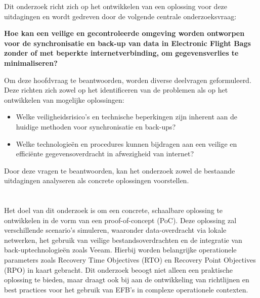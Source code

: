 Dit onderzoek richt zich op het ontwikkelen van een oplossing voor deze uitdagingen en wordt gedreven door de volgende centrale onderzoeksvraag:

\textbf{Hoe kan een veilige en gecontroleerde omgeving worden ontworpen voor de synchronisatie en back-up van data in Electronic Flight Bags zonder of met beperkte internetverbinding, om gegevensverlies te minimaliseren?}

Om deze hoofdvraag te beantwoorden, worden diverse deelvragen geformuleerd. Deze richten zich zowel op het identificeren van de problemen als op het ontwikkelen van mogelijke oplossingen:

\begin{itemize}
    \item Welke veiligheidsrisico’s en technische beperkingen zijn inherent aan de huidige methoden voor synchronisatie en back-ups?
    \item Welke technologieën en procedures kunnen bijdragen aan een veilige en efficiënte gegevensoverdracht in afwezigheid van internet?
\end{itemize}

Door deze vragen te beantwoorden, kan het onderzoek zowel de bestaande uitdagingen analyseren als concrete oplossingen voorstellen.

\section{}%
\label{sec:onderzoeksdoelstelling}

Het doel van dit onderzoek is om een concrete, schaalbare oplossing te ontwikkelen in de vorm van een proof-of-concept (PoC). Deze oplossing zal verschillende scenario’s simuleren, waaronder data-overdracht via lokale netwerken, het gebruik van veilige bestandsoverdrachten en de integratie van back-uptechnologieën zoals Veeam. Hierbij worden belangrijke operationele parameters zoals Recovery Time Objectives (RTO) en Recovery Point Objectives (RPO) in kaart gebracht. Dit onderzoek beoogt niet alleen een praktische oplossing te bieden, maar draagt ook bij aan de ontwikkeling van richtlijnen en best practices voor het gebruik van EFB's in complexe operationele contexten.


\section{}%
\label{sec:opzet-bachelorproef}

